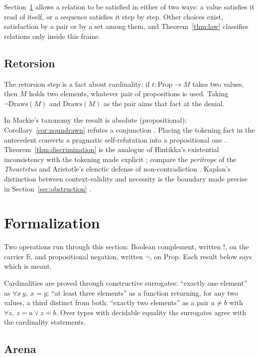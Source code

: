 \documentclass[11pt]{article}
\newcommand{\Draws}{\mathrm{Draws}}
\newcommand{\B}{\mathbb{B}}
\begin{document}
Section~\ref{sec:formal} allows a relation to be satisfied in either of two ways: a value satisfies it read of itself, or a sequence satisfies it step by step. Other choices exist, satisfaction by a pair or by a set among them, and Theorem~\ref{thm:law} classifies relations only inside this frame.

\subsection{Retorsion}
\label{sec:retorsionclass}

The retorsion step is a fact about cardinality: if $t : \mathrm{Prop} \to M$ takes two values, then $M$ holds two elements, whatever pair of propositions is used. Taking $\lnot\Draws(M)$ and $\Draws(M)$ as the pair aims that fact at the denial.

In Mackie's taxonomy the result is absolute (propositional): Corollary~\ref{cor:noundrawn} refutes a conjunction \cite{mackie1964}. Placing the tokening fact in the antecedent converts a pragmatic self-refutation into a propositional one \cite{castagnoli2010}. Theorem~\ref{thm:discrimination} is the analogue of Hintikka's existential inconsistency with the tokening made explicit \cite{hintikka1962}; compare the \emph{peritrope} of the \emph{Theaetetus} and Aristotle's elenctic defense of non-contradiction \cite{plato,aristotle,burnyeat1976}. Kaplan's distinction between context-validity and necessity is the boundary made precise in Section~\ref{sec:obstruction} \cite{kaplan1989}.

\section{Formalization}
\label{sec:formal}

Two operations run through this section: Boolean complement, written $!$, on the carrier $\B$, and propositional negation, written $\lnot$, on $\mathrm{Prop}$. Each result below says which is meant.

Cardinalities are proved through constructive surrogates: ``exactly one element'' as $\forall x\,y,\ x = y$; ``at least three elements'' as a function returning, for any two values, a third distinct from both; ``exactly two elements'' as a pair $a \neq b$ with $\forall z,\ z = a \lor z = b$. Over types with decidable equality the surrogates agree with the cardinality statements.

\subsection{Arena}
\end{document}
